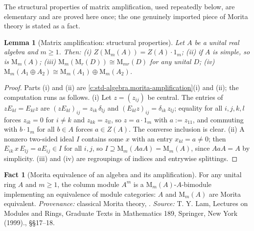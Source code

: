 \documentclass[11pt]{article}
\newtheorem{lemma}[theorem]{Lemma}
\theoremstyle{definition}
\newtheorem{fact}[theorem]{Fact}
\theoremstyle{plain}
\newcommand{\changedmark}[2]{\marginpar{\raggedright\scriptsize\color{#1}#2}}
\providecommand{\Mat}{}\renewcommand{\Mat}{\mathrm{M}}
\begin{document}
\label{c:note.tower.setting-tower-rigidity-frozen-clock-2}
The structural properties of matrix amplification, used repeatedly below, are elementary and are proved here once; the one genuinely imported piece of Morita theory is stated as a fact.

\begin{lemma}[Matrix amplification: structural properties]\label{c:tower.matrix-amplification-structural-properties}
\changedmark{gray}{reworded}
Let $A$ be a unital real algebra and $m \geq 1$. Then: (i) $Z(\Mat_m(A)) = Z(A)\cdot 1_m$; (ii) if $A$ is simple, so is $\Mat_m(A)$; (iii) $\Mat_m(\Mat_r(D)) \cong \Mat_{mr}(D)$ for any unital $D$; (iv) $\Mat_m(A_1 \oplus A_2) \cong \Mat_m(A_1) \oplus \Mat_m(A_2)$.
\end{lemma}
\begin{proof}
Parts (i) and (ii) are \ref{c:std-algebra.morita-amplification}(i) and (ii); the computation runs as follows. (i) Let $z = (z_{ij})$ be central. The entries of $z E_{kl} = E_{kl} z$ are $(z E_{kl})_{ij} = z_{ik}\,\delta_{lj}$ and $(E_{kl} z)_{ij} = \delta_{ik}\, z_{lj}$; equality for all $i, j, k, l$ forces $z_{ik} = 0$ for $i \neq k$ and $z_{kk} = z_{ll}$, so $z = a \cdot 1_m$ with $a := z_{11}$, and commuting with $b \cdot 1_m$ for all $b \in A$ forces $a \in Z(A)$. The converse inclusion is clear. (ii) A nonzero two-sided ideal $I$ contains some $x$ with an entry $x_{kl} = a \neq 0$; then $E_{ik}\, x\, E_{lj} = a E_{ij} \in I$ for all $i, j$, so $I \supseteq \Mat_m(AaA) = \Mat_m(A)$, since $AaA = A$ by simplicity. (iii) and (iv) are regroupings of indices and entrywise splittings.

\end{proof}

\begin{fact}[Morita equivalence of an algebra and its amplification]\label{c:tower.morita-equivalence-algebra-amplification}
For any unital ring $A$ and $m \geq 1$, the column module $A^m$ is a $\Mat_m(A)$-$A$-bimodule implementing an equivalence of module categories: $A$ and $\Mat_m(A)$ are Morita equivalent. \emph{Provenance:} classical Morita theory, \cite[\S\S 17--18]{Lam1999}.
\emph{Source:} T. Y. Lam, Lectures on Modules and Rings, Graduate Texts in Mathematics 189, Springer, New York (1999)., \S\S 17--18.
\end{fact}
\end{document}
